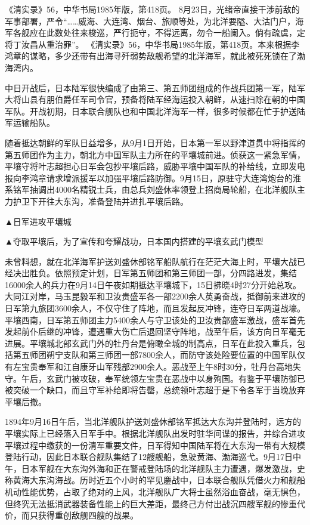 \documentclass[12pt,UTF8]{ctexbook}
\begin{document}
《清实录》56，中华书局1985年版，第418页。
8月23日，光绪帝直接干涉前敌的军事部署，严令“……威海、大连湾、烟台、旅顺等处，为北洋要隘、大沽门户，海军各舰应在此数处往来梭巡，严行扼守，不得远离，勿令一船阑入。倘有疏虞，定将丁汝昌从重治罪”。 《清实录》56，中华书局1985年版，第418页。本来根据李鸿章的谋略，多少还带有出海寻歼弱势敌舰希望的北洋海军，就此被死死锁在了渤海湾内。

中日开战后，日本陆军很快编成了由第三、第五师团组成的作战兵团第一军，陆军大将山县有朋伯爵任军司令官，预备将陆军经海运投入朝鲜，从速扫除在朝的中国军队。开战初期，日本联合舰队也和中国北洋海军一样，很多时候都在忙于护送陆军运输船队。

随着抵达朝鲜的军队日益增多，从9月1日开始，日本第一军以野津道贯中将指挥的第五师团作为主力，朝北方中国军队主力所在的平壤城前进。侦获这一紧急军情，平壤守将叶志超担心日军会包抄平壤后路，威胁平壤中国军队的补给线，立即发电报向李鸿章请求增派援军以加强平壤后路防御。9月15日，原驻守大连湾炮台的淮系铭军抽调出4000名精锐士兵，由总兵刘盛休率领登上招商局轮船，在北洋舰队主力护卫下开往大东沟，准备登陆并进扎平壤后路。


▲日军进攻平壤城


▲夺取平壤后，为了宣传和夸耀战功，日本国内搭建的平壤玄武门模型

未曾料想，就在北洋海军护送刘盛休部铭军船队航行在茫茫大海上时，平壤大战已经决出胜负。依照预定计划，日军第五师团和第三师团一部，分四路进发，集结16000余人的兵力在9月14日午夜如期抵达平壤城下，15日拂晓4时27分开始总攻。大同江对岸，马玉昆毅军和卫汝贵盛军各一部2200余人英勇奋战，抵御前来进攻的日军第九旅团3600余人，不仅守住了阵地，而且发起反冲锋，连夺日军两道战壕。平壤西南，日军第五师团主力5400余人与守卫该处的卫汝贵部盛军激战，盛军首先发起前仆后继的冲锋，遭遇重大伤亡后退回坚守阵地，战至午后，该方向日军毫无进展。平壤城北部玄武门外的牡丹台是俯瞰全城的制高点，日军在此投入重兵，包括第五师团朔宁支队和第三师团一部7800余人，而防守该处险要位置的中国军队仅有左宝贵奉军和江自康牙山军残部2900余人。恶战至上午8时30分，牡丹台高地失守。午后，玄武门被攻破，奉军统领左宝贵在恶战中以身殉国。有鉴于平壤防御已被突破一个缺口，而且守军补给即将告罄，总统领叶志超于是下令各军于当晚放弃平壤后撤。

1894年9月16日午后，当北洋舰队护送刘盛休部铭军抵达大东沟并登陆时，远方的平壤实际上已经落入日军手中。根据北洋舰队出发时驻华间谍的报告，并综合进攻平壤过程中缴获的一份清军重要文件，日军得知中国陆军将在大东沟一带有大规模登陆行动，因此日本联合舰队集结了12艘舰船，急驶黄海、渤海巡弋。9月17日中午，日本军舰在大东沟外海和正在警戒登陆场的北洋舰队主力遭遇，爆发激战，史称黄海大东沟海战。历时近五个小时的罕见鏖战中，日本联合舰队凭借火力和舰船机动性能优势，占取了绝对的上风，北洋舰队广大将士虽然浴血奋战，毫无惧色，但终究无法抵消武器装备性能上的巨大差距，最终己方付出战沉四艘军舰的惨重代价，而只获得重创敌舰四艘的战果。
\end{document}
